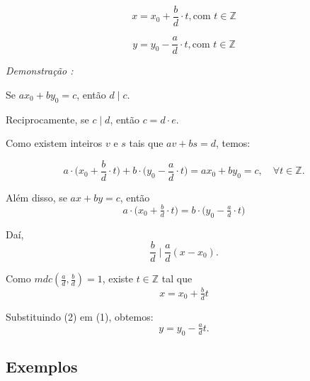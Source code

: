 \[
x = x_0 + \frac{b}{d} \cdot t , \text{com } t \in \mathbb{Z} 
\]

\[
y = y_0 - \frac{a}{d} \cdot t , \text{com } t \in \mathbb{Z}
\]

\noindent\textit{Demonstração : }

Se $ax_0 + by_0 = c$, então $d \mid c$.

Reciprocamente, se $c \mid d$, então $c = d \cdot e$.

Como existem inteiros $v$ e $s$ tais que $av + bs = d$, temos:

\[
a \cdot \Big(x_0 + \frac{b}{d} \cdot t\Big) + b \cdot \Big(y_0 - \frac{a}{d} \cdot t\Big) 
= ax_0 + by_0 = c, \quad \forall t \in \mathbb{Z}.
\]

Além disso, se $ax + by = c$, então
\[
a \cdot \Big(x_0 + \tfrac{b}{d} \cdot t\Big) = b \cdot \Big(y_0 - \tfrac{a}{d} \cdot t\Big) \tag{1}
\]

Daí,
\[
\frac{b}{d} \mid \frac{a}{d}(x-x_0).
\]

Como $mdc\!\left(\tfrac{a}{d}, \tfrac{b}{d}\right) = 1$, existe $t \in \mathbb{Z}$ tal que
\[
\boxed{x = x_0 + \tfrac{b}{d}t} \tag{2}
\]

Substituindo (2) em (1), obtemos:
\[
\boxed{y = y_0 - \tfrac{a}{d}t}.
\]

\subsection*{Exemplos}

